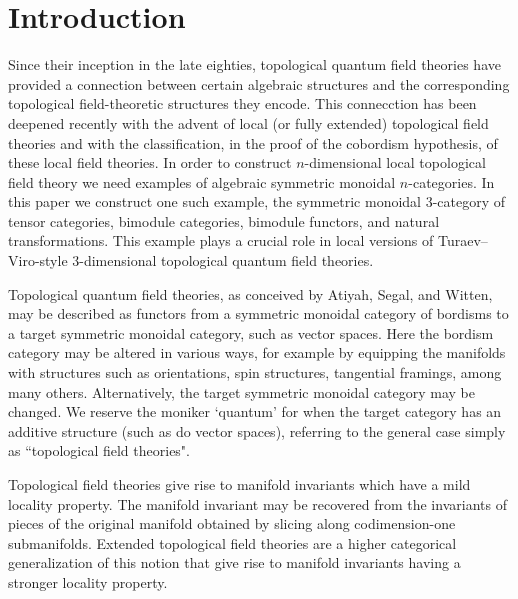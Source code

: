 \documentclass{amsart}
\begin{document}
\tikzexternaldisable
{}

\setcounter{tocdepth}{1}
\tableofcontents



\section{Introduction}
Since their inception in the late eighties, topological quantum field theories have provided a connection between certain algebraic structures and the corresponding topological field-theoretic structures they encode. This connecction has been deepened recently with the advent of local (or fully extended) topological field theories and with the classification, in the proof of the cobordism hypothesis, of these local field theories.  In order to construct $n$-dimensional local topological field theory we need examples of algebraic symmetric monoidal $n$-categories.  In this paper we construct one such example, the symmetric monoidal $3$-category of tensor categories, bimodule categories, bimodule functors, and natural transformations.  This example plays a crucial role in local versions of Turaev--Viro-style $3$-dimensional topological quantum field theories.  %

Topological quantum field theories, as conceived by Atiyah, Segal, and Witten, may be described as functors from a symmetric monoidal category of bordisms to a target symmetric monoidal category, such as vector spaces.  Here the bordism category may be altered in various ways, for example by equipping the manifolds with structures such as orientations, spin structures, tangential framings, among many others.  Alternatively, the target symmetric monoidal category may be changed. We reserve the moniker `quantum' for when the target category has an additive structure (such as do vector spaces), referring to the general case simply as ``topological field theories".

Topological field theories give rise to manifold invariants which have a mild locality property. The manifold invariant may be recovered from the invariants of pieces of the original manifold obtained by slicing along codimension-one submanifolds. Extended topological field theories are a higher categorical generalization of this notion that give rise to manifold invariants having a stronger locality property. 
\end{document}
